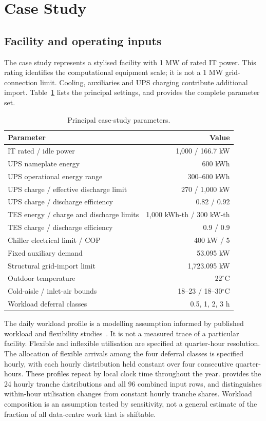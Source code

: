 \section{Case Study}
\label{sec:case-study}
\subsection{Facility and operating inputs}
The case study represents a stylised facility with 1 MW of rated IT power. This rating identifies the computational equipment scale; it is not a 1 MW grid-connection limit. Cooling, auxiliaries and UPS charging contribute additional import. Table~\ref{tab:parameters} lists the principal settings, and  provides the complete parameter set.
\begin{table}[t]
\centering\caption{Principal case-study parameters.}
\label{tab:parameters}
\begin{tabular}{@{}lr@{}}\toprule
Parameter & Value\\\midrule
IT rated / idle power & 1,000 / 166.7 kW\\
UPS nameplate energy & 600 kWh\\
UPS operational energy range & 300--600 kWh\\
UPS charge / effective discharge limit & 270 / 1,000 kW\\
UPS charge / discharge efficiency & 0.82 / 0.92\\
TES energy / charge and discharge limits & 1,000 kWh-th / 300 kW-th\\
TES charge / discharge efficiency & 0.9 / 0.9\\
Chiller electrical limit / COP & 400 kW / 5\\
Fixed auxiliary demand & 53.095 kW\\
Structural grid-import limit & 1,723.095 kW\\
Outdoor temperature & $22^{\circ}$C\\
Cold-aisle / inlet-air bounds & 18--23 / 18--30$^{\circ}$C\\
Workload deferral classes & 0.5, 1, 2, 3 h\\\bottomrule
\end{tabular}
\end{table}

The daily workload profile is a modelling assumption informed by published workload and flexibility studies~\cite{Cao2022ApEn,6779441,Misaghian2023TIA,Liu2012PER}. It is not a measured trace of a particular facility. Flexible and inflexible utilisation are specified at quarter-hour resolution. The allocation of flexible arrivals among the four deferral classes is specified hourly, with each hourly distribution held constant over four consecutive quarter-hours. These profiles repeat by local clock time throughout the year.  provides the 24 hourly tranche distributions and all 96 combined input rows, and distinguishes within-hour utilisation changes from constant hourly tranche shares. Workload composition is an assumption tested by sensitivity, not a general estimate of the fraction of all data-centre work that is shiftable.

